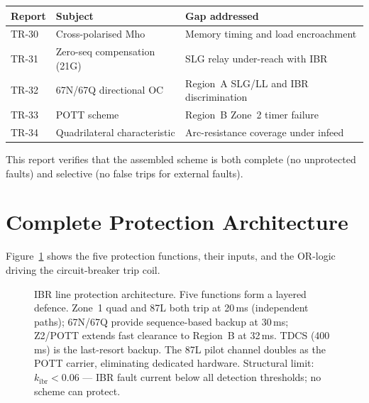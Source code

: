 \documentclass[11pt,a4paper]{article}
\begin{document}
\begin{center}
\begin{tabular}{@{}lll@{}}
\toprule
Report & Subject & Gap addressed\\
\midrule
TR-30~\cite{SAMBP_TR30} & Cross-polarised Mho & Memory timing and load encroachment\\
TR-31~\cite{SAMBP_TR31} & Zero-seq compensation (21G) & SLG relay under-reach with IBR\\
TR-32~\cite{SAMBP_TR32} & 67N/67Q directional OC & Region~A SLG/LL and IBR discrimination\\
TR-33~\cite{SAMBP_TR33} & POTT scheme & Region~B Zone~2 timer failure\\
TR-34~\cite{SAMBP_TR34} & Quadrilateral characteristic & Arc-resistance coverage under infeed\\
\bottomrule
\end{tabular}
\end{center}

\medskip\noindent
This report verifies that the assembled scheme is both complete (no unprotected
faults) and selective (no false trips for external faults).

\section{Complete Protection Architecture}
\label{sec:architecture}

Figure~\ref{fig:arch} shows the five protection functions, their inputs, and
the OR-logic driving the circuit-breaker trip coil.

\begin{figure}[htbp]
  \centering
  \resizebox{0.95\textwidth}{!}{%
  }
  \caption{IBR line protection architecture.  Five functions form a layered
           defence.  Zone~1 quad and 87L both trip at 20\,ms (independent
           paths); 67N/67Q provide sequence-based backup at 30\,ms;
           Z2/POTT extends fast clearance to Region~B at 32\,ms.  TDCS
           (400\,ms) is the last-resort backup.  The 87L pilot channel
           doubles as the POTT carrier, eliminating dedicated hardware.
           Structural limit: $k_\mathrm{ibr}<0.06$ --- IBR fault current
           below all detection thresholds; no scheme can protect.}
  \label{fig:arch}
\end{figure}
\end{document}
